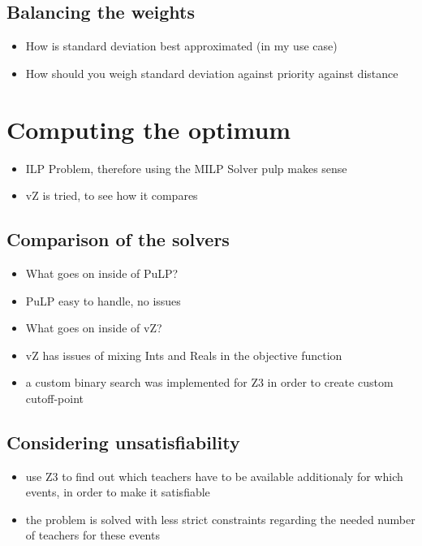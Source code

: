 \documentclass[]{article}
\begin{document}
\subsection{Balancing the weights}
\begin{itemize}
	\item How is standard deviation best approximated (in my use case)
	\item How should you weigh standard deviation against priority against distance
\end{itemize}

\section{Computing the optimum}
\begin{itemize}
	\item ILP Problem, therefore using the MILP Solver pulp makes sense
	\item vZ is tried, to see how it compares
\end{itemize}

\subsection{Comparison of the solvers}
\begin{itemize}
	\item What goes on inside of PuLP?
	\item PuLP easy to handle, no issues
	\item What goes on inside of vZ?
	\item vZ has issues of mixing Ints and Reals in the objective function
	\item a custom binary search was implemented for Z3 in order to create custom cutoff-point
\end{itemize}

\subsection{Considering unsatisfiability}
\begin{itemize}
	\item use Z3 to find out which teachers have to be available additionaly for which events, in order to make it satisfiable
	\item the problem is solved with less strict constraints regarding the needed number of teachers for these events
\end{itemize}
\end{document}
